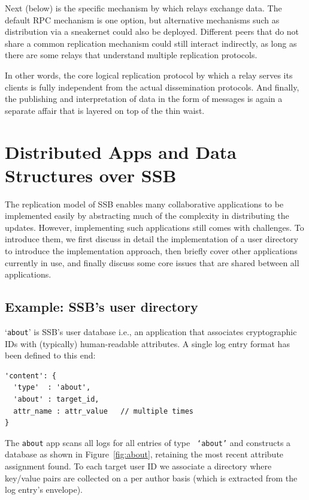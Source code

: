\documentclass[9pt,sigconf,rewiew]{acmart}
\begin{document}
Next (below) is the specific mechanism by which relays exchange data. The default RPC mechanism is one option, but alternative mechanisms such as distribution via a sneakernet could also be deployed. Different peers that do not share a common replication mechanism could still interact indirectly, as long as there are some relays that understand multiple replication protocols.

In other words, the core logical replication protocol by which a relay serves its clients is fully independent from the actual dissemination protocols. And finally, the publishing and interpretation of data in the form of messages is again a separate affair that is layered on top of the thin waist.

\section{Distributed Apps and Data Structures over SSB}
\label{sect:apps}


The replication model of SSB enables many collaborative applications to be implemented easily by abstracting much of the complexity in distributing the updates. However, implementing such applications still comes with challenges. To introduce them, we first discuss in detail the implementation of a user directory to introduce the implementation approach, then briefly cover other applications currently in use, and finally discuss some core issues that are shared between all applications.

\subsection{Example: SSB's user directory}
\label{ssect:about}

`{\small\tt about}' is SSB's user database i.e., an application that
associates cryptographic IDs with (typically) human-readable
attributes. A single log entry format has been defined to this end:
{\small\begin{verbatim}
'content': {
  'type'  : 'about',
  'about' : target_id,
  attr_name : attr_value   // multiple times
}
\end{verbatim}}

\noindent
The {\small\tt about} app scans all logs for all entries of type {\small\tt
  `about'} and constructs a database as shown in
Figure~\ref{fig:about}, retaining the most recent attribute assignment
found.  To each target user ID we associate a directory where
key/value pairs are collected on a per author basis (which is extracted
from the log entry's envelope).
\end{document}
